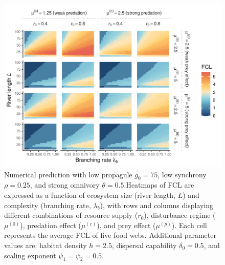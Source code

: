 \begin{figure}
\centering
\includegraphics{../data_fmt/fig_rho025_g75_theta05.pdf}
\caption{Numerical prediction with low propagule \(g_0 = 75\), low
synchrony \(\rho = 0.25\), and strong omnivory \(\theta = 0.5\).Heatmaps
of FCL are expressed as a function of ecosystem size (river length,
\(L\)) and complexity (branching rate, \(\lambda_b\)), with rows and
columns displaying different combinations of resource supply (\(r_0\)),
disturbance regime (\(\mu^{(0)}\)), predation effect (\(\mu^{(c)}\)),
and prey effect (\(\mu^{(p)}\)). Each cell represents the average FCL of
five food webs. Additional parameter values are: habitat density
\(h=2.5\), dispersal capability \(\delta_0=0.5\), and scaling exponent
\(\psi_1=\psi_2=0.5\).}
\end{figure}

\newpage

